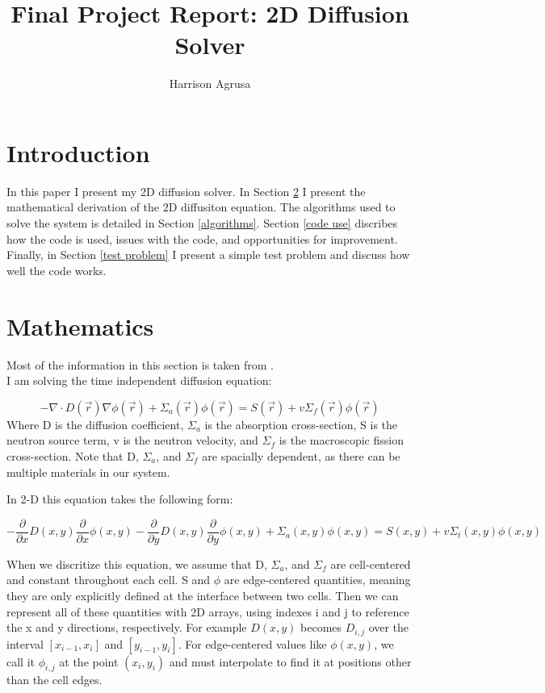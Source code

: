 \documentclass[a4paper,12pt]{article}
\title{Final Project Report: 2D Diffusion Solver}
\author{Harrison Agrusa}
\begin{document}
\maketitle
\onehalfspacing
\section{Introduction}
In this paper I present my 2D diffusion solver. In Section \ref{math} I present the mathematical derivation of the 2D diffusiton equation. The algorithms used to solve the system is detailed in Section \ref{algorithms}. Section \ref{code use} discribes how the code is used, issues with the code, and opportunities for improvement. Finally, in Section \ref{test problem} I present a simple test problem and discuss how well the code works.


\section{Mathematics}\label{math}
Most of the information in this section is taken from \cite{slaybaugh}.\\
I am solving the time independent diffusion equation:

\begin{equation}
-\nabla \cdot D(\vec{r})\nabla\phi(\vec{r}) + \Sigma_{a}(\vec{r})\phi(\vec{r}) = S(\vec{r}) + v\Sigma_{f}(\vec{r})\phi(\vec{r})
\end{equation}
Where D is the diffusion coefficient, $\Sigma_{a}$ is the absorption cross-section, S is the neutron source term, v is the neutron velocity, and $\Sigma_{f}$ is the macroscopic fission cross-section. Note that D, $\Sigma_{a}$, and $\Sigma_{f}$ are spacially dependent, as there can be multiple materials in our system.

In 2-D this equation takes the following form:

\begin{equation}
    -\frac{\partial}{\partial x}D(x,y)\frac{\partial}{\partial x}\phi(x,y) - \frac{\partial}{\partial y}D(x,y)\frac{\partial}{\partial y}\phi(x,y) + \Sigma_{a}(x,y)\phi(x,y) = S(x,y) + v\Sigma_{t}(x,y)\phi(x,y)
\end{equation}

When we discritize this equation, we assume that D, $\Sigma_{a}$, and $\Sigma_{f}$ are cell-centered and constant throughout each cell. S and $\phi$ are edge-centered quantities, meaning they are only explicitly defined at the interface between two cells. Then we can represent all of these quantities with 2D arrays, using indexes i and j to reference the x and y directions, respectively. For example $D(x,y)$ becomes $D_{i,j}$ over the interval $[x_{i-1},x_{i}]$ and $[y_{i-1},y_{i}]$. For edge-centered values like $\phi(x,y)$, we call it $\phi_{i,j}$ at the point $(x_{i},y_{i})$ and must interpolate to find it at positions other than the cell edges. \\
\end{document}
